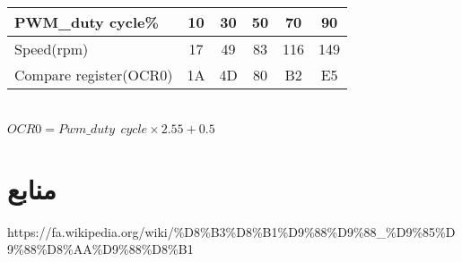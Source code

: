 \documentclass{article}
\begin{document}
\section{}
\begin{latin}
\begin{longtable}[c]{|l|c|c|c|c|c|}
\hline
PWM\_duty cycle\%      & 10 & 30 & 50 & 70  & 90  \\ \hline
\endfirsthead
%
\endhead
%
Speed(rpm)             & 17 & 49 & 83 & 116 & 149 \\ \hline
Compare register(OCR0) & 1A & 4D & 80 & B2  & E5  \\ \hline
\end{longtable}
\end{latin}


\section{}
\begin{latin}
$
OCR0 = Pwm\_duty\:\:cycle \times 2.55 + 0.5
$
\end{latin}



\section*{منابع}
\renewcommand{\section}[2]{}%
\begin{thebibliography}{99} %


\begin{LTRitems}

\resetlatinfont

https://fa.wikipedia.org/wiki/\%D8\%B3\%D8\%B1\%D9\%88\%D9\%88\_\%D9\%85\%D9\%88\%D8\%AA\%D9\%88\%D8\%B1

\end{LTRitems}

\end{thebibliography}
\end{document}
